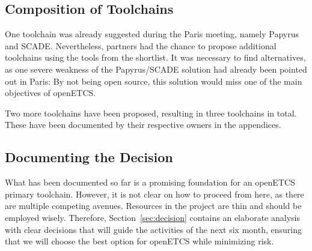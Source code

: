 \subsection{Composition of Toolchains}
\label{sec:composition_of_tool_chains}

One toolchain was already suggested during the Paris meeting, namely Papyrus and SCADE.  Nevertheless, partners had the chance to propose additional toolchains using the tools from the shortlist.  It was necessary to find alternatives, as one severe weakness of the Papyrus/SCADE solution had already been pointed out in Paris: By not being open source, this solution would miss one of the main objectives of openETCS.

Two more toolchains have been proposed, resulting in three toolchains in total.  These have been documented by their respective owners in the appendices.

\subsection{Documenting the Decision}
\label{sec:documenting_the_decision}

What has been documented so far is a promising foundation for an openETCS primary toolchain.  However, it is not clear on how to proceed from here, as there are multiple competing avenues.  Resources in the project are thin and should be employed wisely.  Therefore, Section~\ref{sec:decision} contains an elaborate analysis with clear decisions that will guide the activities of the next six month, ensuring that we will choose the best option for openETCS while minimizing risk.



